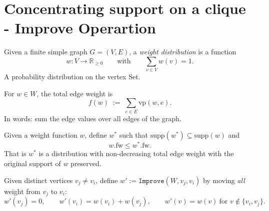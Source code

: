 


\section{Concentrating support on a clique - Improve Operartion}

\begin{definition}
  \label{def:FunToMax}
  \leanok
Given a finite simple graph \(G=(V,E)\), a \emph{weight distribution} is a function
\[
w:V\to \mathbb{R}_{\ge 0}
\qquad\text{with}\qquad
\sum_{v\in V} w(v)=1.
\]
A probability distribution on the vertex Set.
\end{definition}

\begin{definition}
  \label{def:fw}
  \leanok
For \(w\in W\), the total edge weight is
\[
f(w)\;:=\;\sum_{e\in E} \text{vp}(w,e).
\]
In words: sum the edge values over all edges of the graph.
\end{definition}

\begin{definition}
    \label{def:Better}
Given a weight function \(w\), define \(w^*\) such that \(\mathrm{supp}(w^*) \subseteq \mathrm{supp}(w)\) and 
\[
w.\mathrm{fw} \leq w^*.\mathrm{fw}.
\]
That is \(w^*\) is a distribution with non-decreasing total edge weight with the original support of \(w\) preserved.
\end{definition}

\begin{definition}
  \label{def:Improve}
Given distinct vertices \(v_j \neq v_i\), define \(w' := \texttt{Improve}(W, v_j, v_i)\) by moving \emph{all} weight from \(v_j\) to \(v_i\):
\[
  w'(v_j)=0,\qquad
  w'(v_i)=w(v_i)+w(v_j),\qquad
  w'(v)=w(v)\ \text{for } v\notin\{v_i,v_j\}.
\]
\end{definition}

